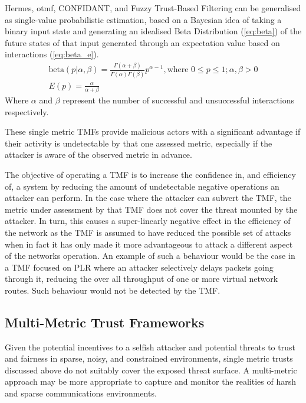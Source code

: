 Hermes, \gls{otmf}, CONFIDANT, and Fuzzy Trust-Based Filtering can be generalised as single-value probabilistic estimation, based on a Bayesian idea of taking a binary input state and generating an idealised Beta Distribution (\ref{eq:beta}) of the future states of that input generated through an expectation value based on interactions (\ref{eq:beta_e}).
%
\begin{align}
  \label{eq:beta}
  \text{beta}(p|\alpha,\beta) = \frac{\Gamma(\alpha + \beta)}{\Gamma(\alpha)\Gamma(\beta)}p^{\alpha-1},\text{where } 0 \leq p \leq 1; \alpha,\beta > 0\\
  \label{eq:beta_e}
  E(p) = \frac{\alpha}{\alpha + \beta}
\end{align}
%
Where $\alpha$ and $\beta$ represent the number of successful and unsuccessful interactions respectively.

These single metric TMFs provide malicious actors with a significant advantage if their activity is undetectable by that one assessed metric, especially if the attacker is aware of the observed metric in advance.

The objective of operating a TMF is to increase the confidence in, and efficiency of, a system by reducing the amount of undetectable negative operations an attacker can perform.
In the case where the attacker can subvert the TMF, the metric under assessment by that TMF does not cover the threat mounted by the attacker.
In turn, this causes a super-linearly negative effect in the efficiency of the network as the TMF is assumed to have reduced the possible set of attacks when in fact it has only made it more advantageous to attack a different aspect of the networks operation.
An example of such a behaviour would be the case in a TMF focused on PLR where an attacker selectively delays packets going through it, reducing the over all throughput of one or more virtual network routes.
Such behaviour would not be detected by the TMF.

\subsection{Multi-Metric Trust Frameworks}\label{sec:multimetrictrust}
Given the potential incentives to a selfish attacker and potential threats to trust and fairness in sparse, noisy, and constrained environments, single metric trusts discussed above do not suitably cover the exposed threat surface.
A multi-metric approach may be more appropriate to capture and monitor the realities of harsh and sparse communications environments.

